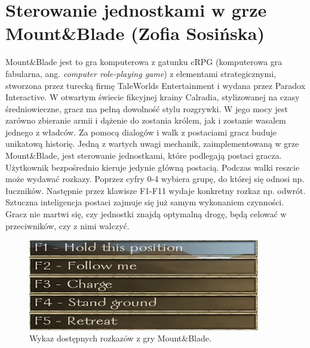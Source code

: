 \section{Sterowanie jednostkami w grze Mount\&Blade (Zofia Sosińska)}\label{chap:mb}

Mount\&Blade jest to gra komputerowa z gatunku cRPG (komputerowa gra fabularna, ang. \textit{computer role-playing game}) z elementami strategicznymi, stworzona przez turecką firmę TaleWorlds Entertainment i wydana przez Paradox Interactive. W otwartym świecie fikcyjnej krainy Calradia, stylizowanej na czasy średniowieczne, gracz ma pełną dowolność stylu rozgrywki. W jego mocy jest zarówno zbieranie armii i dążenie do zostania królem, jak i zostanie wasalem jednego z władców. Za pomocą dialogów i walk z postaciami gracz buduje unikatową historię.
Jedną z wartych uwagi mechanik, zaimplementowaną w grze Mount\&Blade, jest sterowanie jednostkami, które podlegają postaci gracza. Użytkownik bezpośrednio kieruje jedynie główną postacią. Podczas walki reszcie może wydawać rozkazy. Poprzez cyfry 0-4 wybiera grupę, do której się odnosi np. łuczników. Następnie przez klawisze F1-F11 wydaje konkretny rozkaz np. odwrót. Sztuczna inteligencja postaci zajmuje się już samym wykonaniem czynności. Gracz nie martwi się, czy jednostki znajdą optymalną drogę, będą celować w przeciwników, czy z nimi walczyć.


\begin{figure}[h!tbp]
    \centering
    \includegraphics[width=0.9\textwidth]{images/ui/commandsMountBla.png}
    \caption{Wykaz dostępnych rozkazów z gry Mount\&Blade.}\label{fig:MountnBlade}
    \label{fig:mnb}
\end{figure}
